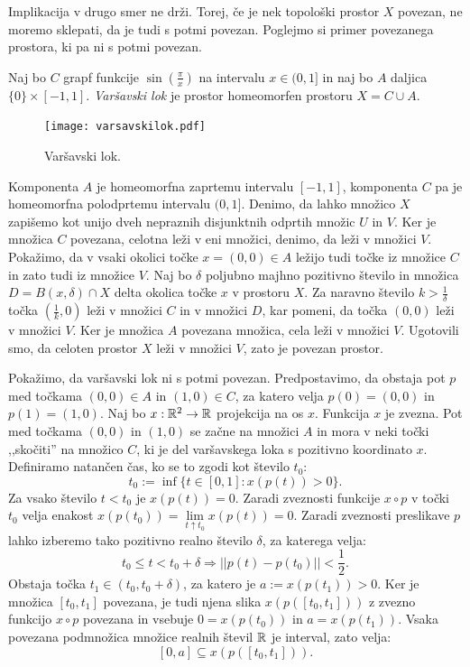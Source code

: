\documentclass[../TG_magistrsko_delo_sections.tex]{subfiles}
\begin{document}
Implikacija v drugo smer ne drži. Torej, če je nek topološki prostor $X$ povezan, ne moremo sklepati, da je tudi s potmi povezan. Poglejmo si primer povezanega prostora, ki pa ni s potmi povezan.

\begin{definicija}
Naj bo $C$ grapf funkcije $\sin\left(\frac{\pi}{x}\right)$ na intervalu $x \in (0 , 1]$ in naj bo $A$ daljica $\{ 0 \} \times [-1 , 1]$. \emph{Varšavski lok} je prostor homeomorfen prostoru $X = C \cup A$.
\end{definicija}

\begin{figure}[h]
  \centering
  \texttt{[image: varsavskilok.pdf]}
  \caption[Primer vektorske slike.]{Varšavski lok.}
  \label{fig:varsavski_lok}
\end{figure}


Komponenta $A$ je homeomorfna zaprtemu intervalu $[-1, 1]$, komponenta $C$ pa je homeomorfna polodprtemu intervalu $(0, 1]$. Denimo, da lahko množico $X$ zapišemo kot unijo dveh nepraznih disjunktnih odprtih množic $U$ in $V$. Ker je množica $C$ povezana, celotna leži v eni množici, denimo, da leži v množici $V$. Pokažimo, da v vsaki okolici točke $x = (0, 0) \in  A$ ležijo tudi točke iz množice $C$ in zato tudi iz množice $V$. Naj bo $\delta$ poljubno majhno pozitivno število in množica $D = B(x, \delta) \cap X$ delta okolica točke $x$ v prostoru $X$. Za naravno število $k > \frac{1}{\delta}$ točka $\left(\frac{1}{k}, 0\right)$ leži v množici $C$ in v množici $D$, kar pomeni, da točka $(0, 0)$ leži v množici $V$. Ker je množica $A$ povezana množica, cela leži v množici $V$. Ugotovili smo, da celoten prostor $X$ leži v množici $V$, zato je povezan prostor.

Pokažimo, da varšavski lok ni s potmi povezan. Predpostavimo, da obstaja pot $p$ med točkama $(0, 0) \in A$ in $(1, 0) \in C$, za katero velja $p(0) = (0, 0)$ in $p(1) = (1, 0)$. Naj bo $x: \mathbb R^2 \to \mathbb R$ projekcija na os $x$. Funkcija $x$ je zvezna. Pot med točkama $(0, 0)$ in $(1, 0)$ se začne na množici $A$ in mora v neki točki ,,skočiti'' na množico $C$, ki je del varšavskega loka s pozitivno koordinato $x$.   
Definiramo natančen čas, ko se to zgodi kot število $t_0$:
$$t_0 := \inf\{t \in [0, 1]: x(p(t)) > 0 \}.$$
Za vsako število $t < t_0$ je $x(p(t)) = 0$. Zaradi zveznosti funkcije $x \circ p$ v točki $t_0$ velja enakost $x(p(t_0)) = \lim\limits_{t \uparrow t_0} x(p(t)) = 0$. Zaradi zveznosti preslikave $p$ lahko izberemo tako pozitivno realno število $\delta$, za katerega velja:
$$t_0 \leq t < t_0 + \delta \Rightarrow ||p(t) - p(t_0)|| < \frac{1}{2}.$$
Obstaja točka $t_1 \in (t_0, t_0 + \delta)$, za katero je $a := x(p(t_1)) >0$. Ker je množica $[t_0, t_1]$ povezana, je tudi njena slika $x(p([t_0, t_1]))$ z zvezno funkcijo $x \circ p$ povezana in vsebuje $0 = x(p(t_0))$ in $a = x(p(t_1))$. Vsaka povezana podmnožica množice realnih števil $\mathbb R$ je interval, zato velja:
$$[0, a] \subseteq x(p([t_0, t_1])).$$
\end{document}
